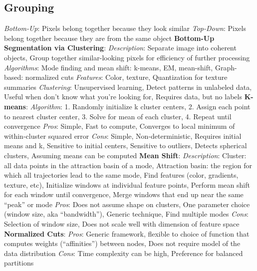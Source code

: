 \documentclass{article}
\begin{document}
\begin{multicols*}{2}
        \subsection*{Grouping}
        \textit{Bottom-Up}: Pixels belong together because they look similar\newline
        \textit{Top-Down}: Pixels belong together because they are from the same object\newline
        \textbf{Bottom-Up Segmentation via Clustering}:\newline
        \textit{Description}: Separate image into coherent objects, Group together similar-looking pixels for
        efficiency of further processing\newline
        \textit{Algorithms}: Mode finding and mean shift: k-means, EM, mean-shift, Graph-based: normalized cuts\newline
        \textit{Features}: Color, texture, Quantization for texture summaries\newline
        \textit{Clustering}: Unsupervised learning, Detect patterns in unlabeled data, Useful when don’t know what
        you’re looking for, Requires data, but no labels\newline
        \textbf{K-means}:\newline
        \textit{Algorithm}: 1. Randomly initialize k cluster centers, 2. Assign each point to nearest cluster center,
        3. Solve for mean of each cluster, 4. Repeat until convergence\newline
        \textit{Pros}: Simple, Fast to compute, Converges to local minimum of within-cluster squared error
        \textit{Cons}: Simple, Non-deterministic, Requires initial means and k, Sensitive to initial centers, Sensitive
        to outliers, Detects spherical clusters, Assuming means can be computed\newline
        \textbf{Mean Shift}:\newline
        \textit{Description}: Cluster: all data points in the attraction basin of a mode, Attraction basin: the
        region for which all trajectories lead to the same mode, Find features (color, gradients, texture, etc),
        Initialize windows at individual feature points, Perform mean shift for each window until convergence, Merge
        windows that end up near the same “peak” or mode\newline
        \textit{Pros}: Does not assume shape on clusters, One parameter choice (window size, aka “bandwidth”), Generic
        technique, Find multiple modes\newline
        \textit{Cons}: Selection of window size, Does not scale well with dimension of feature space\newline
        \textbf{Normalized Cuts}:\newline
        \textit{Pros}: Generic framework, flexible to choice of function that computes weights (“affinities”) between
        nodes, Does not require model of the data distribution\newline
        \textit{Cons}: Time complexity can be high, Preference for balanced partitions\newline
    \end{multicols*}
\end{document}
